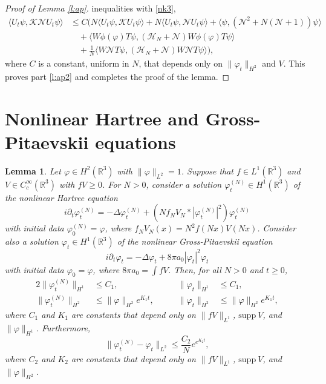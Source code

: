 \documentclass[11pt,a4paper]{scrartcl}
\newtheorem{lem}[thm]{Lemma}
\newcommand{\R}{\mathds{R}}
\newcommand{\N}{\mathcal{N}}
\newcommand{\K}{\mathcal{K}}
\begin{document}
\begin{proof}[Proof of Lemma \ref{l:ap}]
  inequalities with \eqref{nk3},
  \begin{align*}
    \langle U_t \psi, \K \N U_t \psi \rangle & \le C \big( N \langle U_t
    \psi, \K U_t \psi \rangle + N \langle U_t \psi, \N U_t \psi \rangle +
    \langle \psi, (\N^2 + N (\N + 1)) \psi \rangle \\
    & \quad + \langle W \phi(\varphi) T \psi, (\mathcal{H}_N + \N) W
    \phi(\varphi) T \psi \rangle \\
    & \quad + \frac{1}{N} \langle W \N T \psi, (\mathcal{H}_N + \N) W \N T
    \psi \rangle \big),
  \end{align*}
  where $C$ is a constant, uniform in $N$, that depends only on $\| \varphi_t
  \|_{H^2}$ and $V$. This proves part \ref{l:ap2} and completes the proof of
  the lemma.
\end{proof}


\section{Nonlinear Hartree and Gross-Pitaevskii equations}


\begin{lem} \label{l:pdes}
  Let $\varphi \in H^2(\R^3)$ with $\| \varphi \|_{L^2} = 1$. Suppose that $f
  \in L^1(\R^3)$ and $V \in C_c^\infty(\R^3)$ with $fV \ge 0$. For $N > 0$,
  consider a solution $\varphi_t^{(N)} \in H^1(\R^3)$ of the nonlinear Hartree
  equation
  \[
    i \partial_t \varphi_t^{(N)} = - \Delta \varphi_t^{(N)} + (N f_N V_N *
    |\varphi_t^{(N)}|^2) \varphi_t^{(N)}
  \]
  with initial data $\varphi^{(N)}_0 = \varphi$, where $f_N V_N(x) = N^2
  f(Nx)V(Nx)$. Consider also a solution $\varphi_t \in H^1(\R^3)$ of the
  nonlinear Gross-Pitaevskii equation
  \[
    i \partial_t \varphi_t = - \Delta \varphi_t + 8 \pi a_0 |\varphi_t|^2
    \varphi_t
  \]
  with initial data $\varphi_0 = \varphi$, where $8 \pi a_0 = \int f V$. Then,
  for all $N > 0$ and $t \ge 0$,
  \begin{alignat}{2}
    \| \varphi_t^{(N)} \|_{H^1} & \le C_1, & \qquad \| \varphi_t \|_{H^1} &
    \le C_1, \tag{i} \label{H1} \\
    \| \varphi_t^{(N)} \|_{H^2} & \le \| \varphi \|_{H^2} e^{K_1 t}, & \qquad
    \| \varphi_t \|_{H^2} & \le \| \varphi \|_{H^2} e^{K_1 t}, \tag{ii}
  \end{alignat}
  where $C_1$ and $K_1$ are constants that depend only on $\| fV \|_{L^1}$,
  $\text{supp} \ V$, and $\| \varphi \|_{H^1}$. Furthermore,
  \begin{equation}
    \| \varphi_t^{(N)} - \varphi_t \|_{L^2} \le \frac{C_2}{N} e^{e^{K_2 t}},
    \tag{iii}
  \end{equation}
  where $C_2$ and $K_2$ are constants that depend only on $\| fV \|_{L^1}$,
  $\text{supp} \ V$, and $\| \varphi \|_{H^2}$.
\end{lem}
\end{document}
